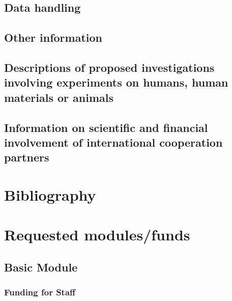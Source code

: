 \documentclass{scrartcl}
\begin{document}
\subsection{Data handling}

\subsection{Other information}

\subsection{Descriptions of proposed investigations involving experiments on humans, human materials or animals}

\subsection{Information on scientific and financial involvement of international cooperation partners}

\section{Bibliography}

\printbibliography[notcategory=reviewed, notcategory=nonreviewed, notcategory=patents_pending, notcategory=patents, heading=none]


\section{Requested modules/funds}

\subsection{Basic Module}

\subsubsection{Funding for Staff}
\begin{funds}


\end{funds}
\end{document}
